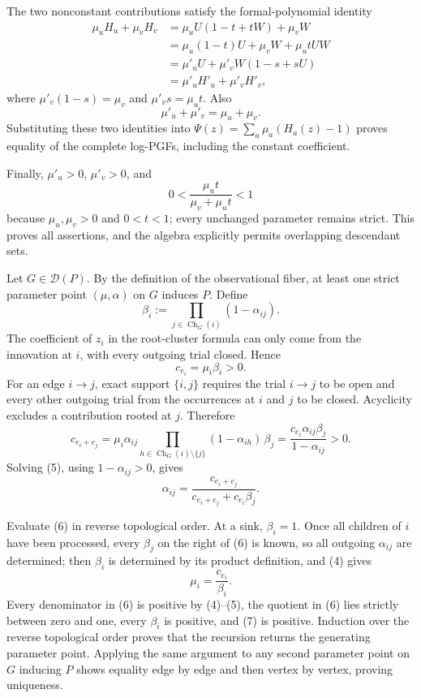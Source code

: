 The two nonconstant contributions satisfy the formal-polynomial identity
\[
\begin{aligned}
 \mu_uH_u+\mu_vH_v
 &=\mu_uU(1-t+tW)+\mu_vW\\
 &=\mu_u(1-t)U+\mu_vW+\mu_utUW\\
 &=\mu'_uU+\mu'_vW(1-s+sU)\\
 &=\mu'_uH'_u+\mu'_vH'_v,
\end{aligned}
\]
where \(\mu'_v(1-s)=\mu_v\) and \(\mu'_vs=\mu_ut\).  Also
\[
 \mu'_u+\mu'_v=\mu_u+\mu_v.
\]
Substituting these two identities into
\(\Psi(z)=\sum_a\mu_a(H_a(z)-1)\) proves equality of the complete log-PGFs, including the constant coefficient.

Finally, \(\mu'_u>0\), \(\mu'_v>0\), and
\[
 0<\frac{\mu_ut}{\mu_v+\mu_ut}<1
\]
because \(\mu_u,\mu_v>0\) and \(0<t<1\); every unchanged parameter remains strict.  This proves all assertions, and the algebra explicitly permits overlapping descendant sets.

Let \(G\in\mathcal D(P)\).  By the definition of the observational fiber, at least one strict parameter point \((\mu,\alpha)\) on \(G\) induces \(P\).  Define
\[
 \beta_i:=\prod_{j\in\operatorname{Ch}_G(i)}(1-\alpha_{ij}).
\]
The coefficient of \(z_i\) in the root-cluster formula can only come from the innovation at \(i\), with every outgoing trial closed.  Hence
\[
 c_{e_i}=\mu_i\beta_i>0.
\tag{4}
\]
For an edge \(i\to j\), exact support \(\{i,j\}\) requires the trial \(i\to j\) to be open and every other outgoing trial from the occurrences at \(i\) and \(j\) to be closed.  Acyclicity excludes a contribution rooted at \(j\).  Therefore
\[
 c_{e_i+e_j}
 =\mu_i\alpha_{ij}
   \prod_{h\in\operatorname{Ch}_G(i)\setminus\{j\}}(1-\alpha_{ih})\,\beta_j
 =\frac{c_{e_i}\alpha_{ij}\beta_j}{1-\alpha_{ij}}>0.
\tag{5}
\]
Solving (5), using \(1-\alpha_{ij}>0\), gives
\[
 \alpha_{ij}
 =\frac{c_{e_i+e_j}}
        {c_{e_i+e_j}+c_{e_i}\beta_j}.
\tag{6}
\]

Evaluate (6) in reverse topological order.  At a sink, \(\beta_i=1\).  Once all children of \(i\) have been processed, every \(\beta_j\) on the right of (6) is known, so all outgoing \(\alpha_{ij}\) are determined; then \(\beta_i\) is determined by its product definition, and (4) gives
\[
 \mu_i=\frac{c_{e_i}}{\beta_i}.
\tag{7}
\]
Every denominator in (6) is positive by (4)--(5), the quotient in (6) lies strictly between zero and one, every \(\beta_i\) is positive, and (7) is positive.  Induction over the reverse topological order proves that the recursion returns the generating parameter point.  Applying the same argument to any second parameter point on \(G\) inducing \(P\) shows equality edge by edge and then vertex by vertex, proving uniqueness.

